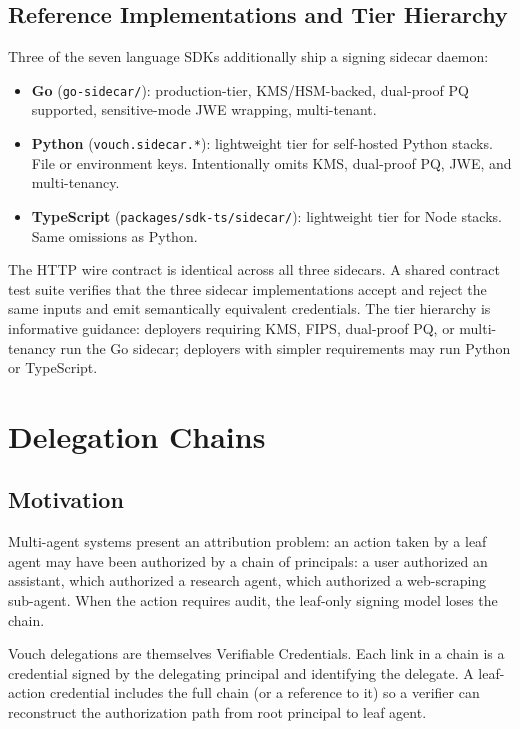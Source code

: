 \documentclass[11pt,a4paper]{article}
\begin{document}
\subsection{Reference Implementations and Tier Hierarchy}

Three of the seven language SDKs additionally ship a signing sidecar daemon:

\begin{itemize}[leftmargin=*]
\item \textbf{Go} (\verb|go-sidecar/|): production-tier, KMS/HSM-backed, dual-proof PQ supported, sensitive-mode JWE wrapping, multi-tenant.
\item \textbf{Python} (\verb|vouch.sidecar.*|): lightweight tier for self-hosted Python stacks. File or environment keys. Intentionally omits KMS, dual-proof PQ, JWE, and multi-tenancy.
\item \textbf{TypeScript} (\verb|packages/sdk-ts/sidecar/|): lightweight tier for Node stacks. Same omissions as Python.
\end{itemize}

The HTTP wire contract is identical across all three sidecars. A shared contract test suite verifies that the three sidecar implementations accept and reject the same inputs and emit semantically equivalent credentials. The tier hierarchy is informative guidance: deployers requiring KMS, FIPS, dual-proof PQ, or multi-tenancy run the Go sidecar; deployers with simpler requirements may run Python or TypeScript.

\section{Delegation Chains}
\label{sec:delegation}

\subsection{Motivation}

Multi-agent systems present an attribution problem: an action taken by a leaf agent may have been authorized by a chain of principals: a user authorized an assistant, which authorized a research agent, which authorized a web-scraping sub-agent. When the action requires audit, the leaf-only signing model loses the chain.

Vouch delegations are themselves Verifiable Credentials. Each link in a chain is a credential signed by the delegating principal and identifying the delegate. A leaf-action credential includes the full chain (or a reference to it) so a verifier can reconstruct the authorization path from root principal to leaf agent.
\end{document}
